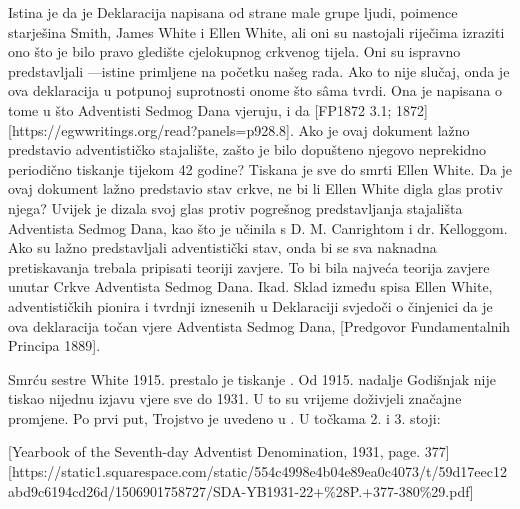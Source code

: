 Istina je da je Deklaracija  napisana od strane male grupe ljudi, poimence starješina Smith, James White i Ellen White, ali oni su nastojali riječima izraziti ono što je bilo pravo gledište cjelokupnog crkvenog tijela. Oni su ispravno predstavljali —istine primljene na početku našeg rada. Ako to nije slučaj, onda je ova deklaracija u potpunoj suprotnosti onome što sâma tvrdi. Ona je napisana  o tome u što Adventisti Sedmog Dana vjeruju,  i da [FP1872 3.1; 1872][https://egwwritings.org/read?panels=p928.8]. Ako je ovaj dokument lažno predstavio adventističko stajalište, zašto je bilo dopušteno njegovo neprekidno periodično tiskanje tijekom 42 godine? Tiskana je sve do smrti Ellen White. Da je ovaj dokument lažno predstavio stav crkve, ne bi li Ellen White digla glas protiv njega? Uvijek je dizala svoj glas protiv pogrešnog predstavljanja stajališta Adventista Sedmog Dana, kao što je učinila s D. M. Canrightom i dr. Kelloggom. Ako su  lažno predstavljali adventistički stav, onda bi se sva naknadna pretiskavanja trebala pripisati teoriji zavjere. To bi bila najveća teorija zavjere unutar Crkve Adventista Sedmog Dana. Ikad. Sklad između spisa Ellen White, adventističkih pionira i tvrdnji iznesenih u Deklaraciji  svjedoči o činjenici da je ova deklaracija točan  vjere Adventista Sedmog Dana, [Predgovor Fundamentalnih Principa 1889].

Smrću sestre White 1915. prestalo je tiskanje . Od 1915. nadalje Godišnjak nije tiskao nijednu izjavu vjere sve do 1931. U to su vrijeme  doživjeli značajne promjene. Po prvi put, Trojstvo je uvedeno u . U točkama 2. i 3. stoji:


[Yearbook of the Seventh-day Adventist Denomination, 1931, page. 377][https://static1.squarespace.com/static/554c4998e4b04e89ea0c4073/t/59d17eec12abd9c6194cd26d/1506901758727/SDA-YB1931-22+\%28P.+377-380\%29.pdf]

